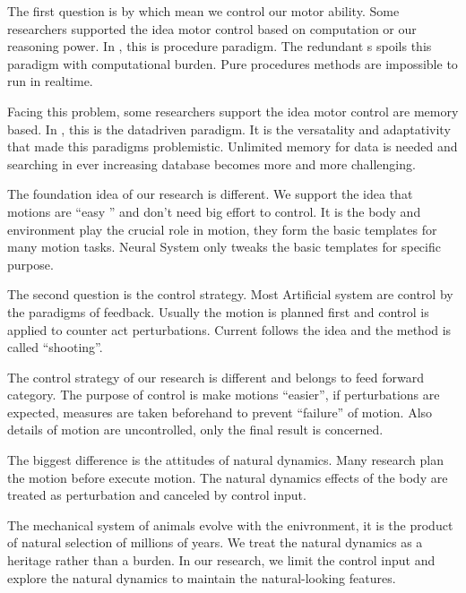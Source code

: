 \begin{itemize}
The first question is by which mean we control our motor ability.
Some researchers supported the idea motor control based on computation or our reasoning power.
In \cms , this is procedure paradigm.
The redundant {\dof}s spoils this paradigm with computational burden.
Pure procedures methods are impossible to run in realtime.

Facing this problem, some researchers support the idea motor control are memory based.
In \cms, this is the datadriven paradigm.
It is the versatality and adaptativity that made this paradigms problemistic.
Unlimited memory for data is needed and searching in ever increasing database becomes more and more challenging.

The foundation idea of our research is different.
We support the idea that motions are ``easy '' and don't need big effort to control.
It is the body and environment play the crucial role in motion, they form the basic templates for many motion tasks.
Neural System only tweaks the basic templates for specific purpose.



 
 
	
The second question is the control strategy.
Most Artificial system are control by the paradigms of feedback.
Usually the motion is planned first and control is applied to counter act perturbations.
Current \cms follows the idea and the method is called ``shooting''.


The control strategy of our research is different and belongs to feed forward category.
The purpose of control is make motions ``easier'', if perturbations are expected, measures are taken beforehand to prevent ``failure'' of motion.
Also details of motion are uncontrolled, only the final result is concerned.


The biggest difference is the attitudes of natural dynamics. 
Many \cms research plan the motion before execute motion.
The natural dynamics effects of the body are treated as perturbation and canceled by control input.


The mechanical system of animals evolve with the enivronment, it is the product of natural selection of millions of years.
We treat the natural dynamics as a heritage rather than a burden. 
In our research, we limit the control input and explore the natural dynamics to maintain the natural-looking features.
\end{itemize}


